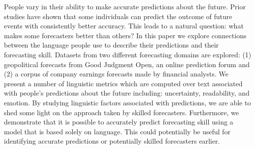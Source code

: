 People vary in their ability to make accurate predictions about the future.  Prior studies have shown that some individuals can predict the outcome of future events with consistently better accuracy.  This leads to a natural question: what makes some forecasters better than others?  In this paper we explore connections between the language people use to describe their predictions and their forecasting skill.  Datasets from two different forecasting domains are explored: (1) geopolitical forecasts from Good Judgment Open, an online prediction forum and (2) a corpus of company earnings forecasts made by financial analysts.  We present a number of linguistic metrics which are computed over text associated with people's predictions about the future including: uncertainty, readability, and emotion.  By studying linguistic factors associated with predictions, we are able to shed some light on the approach taken by skilled forecasters.  Furthermore, we demonstrate that it is possible to accurately predict forecasting skill using a model that is based solely on language.  This could potentially be useful for identifying accurate predictions or potentially skilled forecasters earlier.
